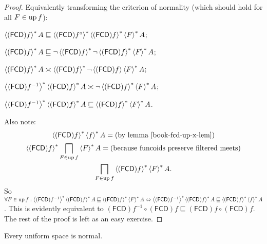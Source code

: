 \begin{proof}
  Equivalently transforming the criterion of normality (which should hold for
  all $F \in \operatorname{up} f$):
  
  $\left\langle (\mathsf{FCD}) f\right\rangle ^{\ast} A \sqsubseteq
  \left\langle (\mathsf{FCD}) f^{\circ}\right\rangle ^{\ast}
  \left\langle (\mathsf{FCD}) f\right\rangle ^{\ast} \left\langle F\right\rangle ^{\ast} A$;
  
  $\left\langle (\mathsf{FCD}) f\right\rangle ^{\ast} A \sqsubseteq \neg
  \left\langle (\mathsf{FCD}) f\right\rangle ^{\ast} \neg \left\langle  (\mathsf{FCD}) f \right\rangle ^{\ast}
  \left\langle F\right\rangle ^{\ast} A$;
  
  $\left\langle (\mathsf{FCD}) f\right\rangle ^{\ast} A \asymp
  \left\langle (\mathsf{FCD}) f\right\rangle ^{\ast} \neg \left\langle (\mathsf{FCD}) f\right\rangle \left\langle F\right\rangle ^{\ast} A$;
  
  $\left\langle (\mathsf{FCD}) f^{- 1}\right\rangle ^{\ast}
  \left\langle (\mathsf{FCD}) f\right\rangle ^{\ast} A \asymp \neg
  \left\langle (\mathsf{FCD}) f\right\rangle ^{\ast} \left\langle F\right\rangle ^{\ast} A$;
  
  $\left\langle (\mathsf{FCD}) f^{- 1}\right\rangle ^{\ast}
  \left\langle (\mathsf{FCD}) f\right\rangle ^{\ast} A \sqsubseteq
  \left\langle (\mathsf{FCD}) f\right\rangle ^{\ast} \left\langle F\right\rangle ^{\ast} A$.
  
  Also note:
  \begin{multline*}
     \rsupfun{(\mathsf{FCD}) f} \rsupfun{f} A = \text{(by lemma~\bookref{fcd-up-x-lem})} \\
     \rsupfun{(\mathsf{FCD}) f} \bigsqcap_{F \in \up f} \rsupfun{F} A = \text{(because funcoids preserve filtered meets)} \\
     \bigsqcap_{F \in \up f} \rsupfun{(\mathsf{FCD}) f} \rsupfun{F}
     A.
  \end{multline*}
  So $\forall F \in \operatorname{up} f : \left\langle  (\mathsf{FCD}) f^{- 1}
  \right\rangle ^{\ast} \left\langle (\mathsf{FCD}) f\right\rangle ^{\ast} A \sqsubseteq
  \left\langle (\mathsf{FCD}) f\right\rangle ^{\ast} \left\langle F\right\rangle ^{\ast} A
  \Leftrightarrow \left\langle (\mathsf{FCD}) f^{- 1}\right\rangle ^{\ast}
  \left\langle (\mathsf{FCD}) f\right\rangle ^{\ast} A \sqsubseteq
  \left\langle (\mathsf{FCD}) f\right\rangle ^{\ast} \left\langle f\right\rangle ^{\ast} A$. This is
  evidently equivalent to $(\mathsf{FCD}) f^{- 1} \circ
  (\mathsf{FCD}) f \sqsubseteq (\mathsf{FCD}) f \circ
  (\mathsf{FCD}) f$. The rest of the proof is left as an easy exercise.
\end{proof}

\begin{cor}
  Every uniform space is normal.
\end{cor}